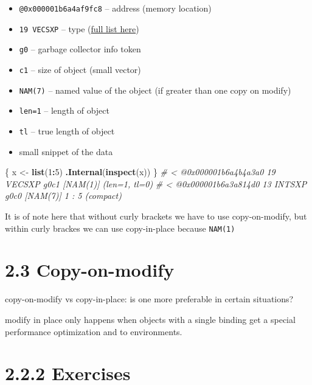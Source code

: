 \documentclass[]{book}
\newenvironment{Shaded}{\begin{snugshade}}{\end{snugshade}}
\newcommand{\CommentTok}[1]{\textcolor[rgb]{0.56,0.35,0.01}{\textit{#1}}}
\newcommand{\DecValTok}[1]{\textcolor[rgb]{0.00,0.00,0.81}{#1}}
\newcommand{\KeywordTok}[1]{\textcolor[rgb]{0.13,0.29,0.53}{\textbf{#1}}}
\newcommand{\NormalTok}[1]{#1}
\newcommand{\OperatorTok}[1]{\textcolor[rgb]{0.81,0.36,0.00}{\textbf{#1}}}
\newcommand{\StringTok}[1]{\textcolor[rgb]{0.31,0.60,0.02}{#1}}
\providecommand{\tightlist}{%
  \setlength{\itemsep}{0pt}\setlength{\parskip}{0pt}}
\begin{document}
\begin{itemize}
\tightlist
\item
  \texttt{@0x000001b6a4af9fc8} -- address (memory location)
\item
  \texttt{19\ VECSXP} -- type (\href{https://cran.r-project.org/doc/manuals/r-release/R-ints.html\#SEXPTYPEs}{full list here})
\item
  \texttt{g0} -- garbage collector info token
\item
  \texttt{c1} -- size of object (small vector)
\item
  \texttt{NAM(7)} -- named value of the object (if greater than one copy on modify)
\item
  \texttt{len=1} -- length of object
\item
  \texttt{tl} -- true length of object
\item
  small snippet of the data
\end{itemize}

\begin{Shaded}
\begin{Highlighting}[]
\NormalTok{\{}
\NormalTok{  x <-}\StringTok{ }\KeywordTok{list}\NormalTok{(}\DecValTok{1}\OperatorTok{:}\DecValTok{5}\NormalTok{)}
  \KeywordTok{.Internal}\NormalTok{(}\KeywordTok{inspect}\NormalTok{(x))}
\NormalTok{\}}
\CommentTok{# < @0x000001b6a4b4a3a0 19 VECSXP g0c1 [NAM(1)] (len=1, tl=0)}
\CommentTok{# < @0x000001b6a3a814d0 13 INTSXP g0c0 [NAM(7)]  1 : 5 (compact)}
\end{Highlighting}
\end{Shaded}

It is of note here that without curly brackets we have to use copy-on-modify, but within curly brackes we can use copy-in-place because \texttt{NAM(1)}

\hypertarget{copy-on-modify}{%
\section*{2.3 Copy-on-modify}\label{copy-on-modify}}

copy-on-modify vs copy-in-place: is one more preferable in certain situations?

modify in place only happens when objects with a single binding get a special performance optimization and to environments.

\hypertarget{exercises}{%
\section*{2.2.2 Exercises}\label{exercises}}
\end{document}
